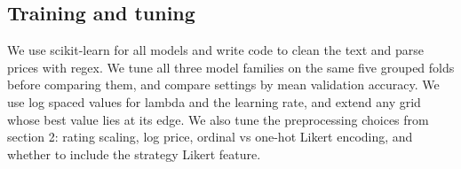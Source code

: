 \documentclass[12pt]{article}
\begin{document}
\subsection{Training and tuning}




We use scikit-learn for all models and write code to clean the text and parse prices with regex. We tune all three model families on the same five grouped folds before comparing them, and compare settings by mean validation accuracy. We use log spaced values for lambda and the learning rate, and extend any grid whose best value lies at its edge. We also tune the preprocessing choices from section 2: rating scaling, log price, ordinal vs one-hot Likert encoding, and whether to include the strategy Likert feature.
\end{document}
